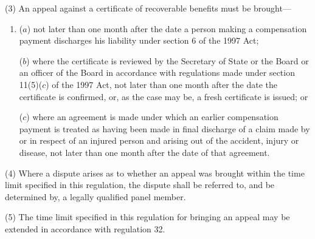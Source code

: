 \documentclass[12pt,a4paper]{article}
\begin{document}
(3) An appeal against a certificate of recoverable benefits must be brought—
\begin{enumerate}\item[]
($a$) not later than one month after the date a person making a compensation payment discharges his liability under section 6 of the 1997 Act;

($b$) where the certificate is reviewed by the Secretary of State 
or the Board or an officer of the Board  %
in accordance with regulations made under section 11(5)($c$) of the 1997 Act, not later than one month after the date the certificate is confirmed, or, as the case may be, a fresh certificate is issued; or

($c$) where an agreement is made under which an earlier compensation payment is treated as having been made in final discharge of a claim made by or in respect of an injured person and arising out of the accident, injury or disease, not later than one month after the date of that agreement.
\end{enumerate}

(4) Where a dispute arises as to whether an appeal was brought within the time limit specified in this regulation, the dispute shall be referred to, and be determined by, a legally qualified panel member.

(5) The time limit specified in this regulation for bringing an appeal may be extended in accordance with regulation 32.

\end{document}
